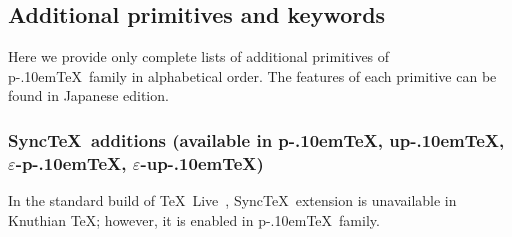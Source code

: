\documentclass[a4paper,11pt]{article}
\def\epTeX{$\varepsilon$-\pTeX}\def\eTeX{$\varepsilon$-\TeX}
\def\eupTeX{$\varepsilon$-\upTeX}\def\upTeX{u\pTeX}
\def\pTeX{p\kern-.10em\TeX}
\def\TL{\TeX\ Live\ }
\begin{document}
\subsection{Additional primitives and keywords}

Here we provide only complete lists of additional primitives
of \pTeX\ family in alphabetical order.
The features of each primitive can be found in Japanese edition.


\def\New#1{--- New primitive since #1}

\subsubsection{Sync\TeX\ additions (available in \pTeX, \upTeX, \epTeX, \eupTeX)}
In the standard build of \TL, Sync\TeX\ extension is unavailable in
Knuthian \TeX; however, it is enabled in \pTeX\ family.
\begin{simplelist}
 \csitem[\.{synctex}]
\end{simplelist}

\end{document}
